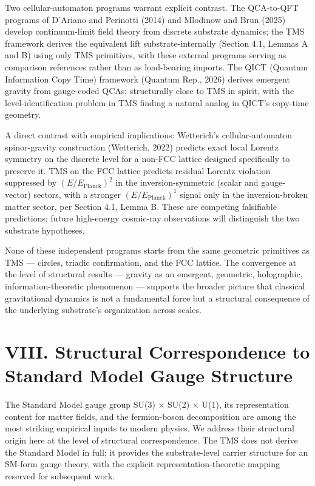 \documentclass[11pt,oneside]{report}
\theoremstyle{definition}
\theoremstyle{remark}
\begin{document}
Two cellular-automaton programs warrant explicit contrast. The
QCA-to-QFT programs of D'Ariano and Perinotti (2014) and Mlodinow and
Brun (2025) develop continuum-limit field theory from discrete substrate
dynamics; the TMS framework derives the equivalent lift
substrate-internally (Section 4.1, Lemmas A and B) using only TMS
primitives, with these external programs serving as comparison
references rather than as load-bearing imports. The QICT (Quantum
Information Copy Time) framework (Quantum Rep., 2026) derives emergent
gravity from gauge-coded QCAs; structurally close to TMS in spirit, with
the level-identification problem in TMS finding a natural analog in
QICT's copy-time geometry.

A direct contrast with empirical implications: Wetterich's
cellular-automaton spinor-gravity construction (Wetterich, 2022)
predicts exact local Lorentz symmetry on the discrete level for a
non-FCC lattice designed specifically to preserve it. TMS on the FCC
lattice predicts residual Lorentz violation suppressed by
\ensuremath{(E/E_{\mathrm{Planck}})^{2}} in the inversion-symmetric (scalar and gauge-vector)
sectors, with a stronger \ensuremath{(E/E_{\mathrm{Planck}})^{1}} signal only in the
inversion-broken matter sector, per Section 4.1, Lemma B. These are
competing falsifiable predictions; future high-energy cosmic-ray
observations will distinguish the two substrate hypotheses.

None of these independent programs starts from the same geometric
primitives as TMS --- circles, triadic confirmation, and the FCC
lattice. The convergence at the level of structural results --- gravity
as an emergent, geometric, holographic, information-theoretic phenomenon
--- supports the broader picture that classical gravitational dynamics
is not a fundamental force but a structural consequence of the
underlying substrate's organization across scales.

\section*{VIII. Structural Correspondence to Standard Model Gauge Structure}

The Standard Model gauge group SU(3) \ensuremath{\times} SU(2) \ensuremath{\times} U(1), its representation
content for matter fields, and the fermion-boson decomposition are among
the most striking empirical inputs to modern physics. We address their
structural origin here at the level of structural correspondence. The
TMS does not derive the Standard Model in full; it provides the
substrate-level carrier structure for an SM-form gauge theory, with the
explicit representation-theoretic mapping reserved for subsequent work.
\end{document}
